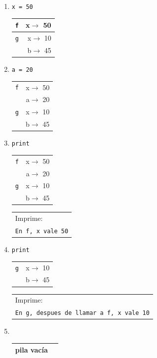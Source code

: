 \begin{enumerate}
\item  \verb|x = 50| \hspace{1.5cm}
	\begin{tabular}{r|r|}
	\hline
	\verb|f|& x$\rightarrow$ 50 \\
	\hline
	\hline
	\verb|g|& x$\rightarrow$ 10 \\
	             & b$\rightarrow$ 45 \\
	\hline
	\end{tabular}

\item  \verb|a = 20| \hspace{1.5cm}
	\begin{tabular}{r|r|}
	\hline
	\verb|f|& x$\rightarrow$ 50 \\
	             & a$\rightarrow$ 20 \\
	\hline
	\hline
	\verb|g|& x$\rightarrow$ 10 \\
	             & b$\rightarrow$ 45 \\
	\hline
	\end{tabular}

\item  \verb|print | \hspace{1.5cm}
	\begin{tabular}{r|r|}
	\hline
	\verb|f|& x$\rightarrow$ 50 \\
	             & a$\rightarrow$ 20 \\
	\hline
	\hline
	\verb|g|& x$\rightarrow$ 10 \\
	             & b$\rightarrow$ 45 \\
	\hline
	\end{tabular}
	\hspace{1cm}
	\begin{tabular}{l}
	Imprime: \\
	{\tt En f, x vale 50}
	\end{tabular}

\item  \verb|print | \hspace{1.5cm}
	\begin{tabular}{r|r|}
	\hline
	\verb|g|& x$\rightarrow$ 10 \\
	             & b$\rightarrow$ 45 \\
	\hline
	\end{tabular}
	\hspace{1cm}
	\begin{tabular}{l}
	Imprime: \\
	{\tt En g, despues de llamar a f, x vale 10}
	\end{tabular}

\item  \verb|      | \hspace{1.5cm}
	\begin{tabular}{r|r|}
	\hline
	pila vacía\\
	\hline
	\end{tabular}

\end{enumerate}

